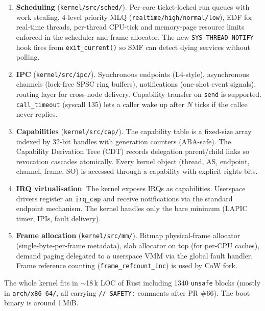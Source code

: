 \documentclass[11pt,a4paper]{article}
\begin{document}
\begin{enumerate}[leftmargin=1.6em,itemsep=0.2em]
  \item \textbf{Scheduling} (\texttt{kernel/src/sched/}). Per-core
        ticket-locked run queues with work stealing, 4-level priority
        MLQ (\texttt{realtime/high/normal/low}), EDF for real-time
        threads, per-thread CPU-tick and memory-page resource limits
        enforced in the scheduler and frame allocator. The new
        \texttt{SYS\_THREAD\_NOTIFY} hook fires from
        \texttt{exit\_current()} so SMF can detect dying services
        without polling.

  \item \textbf{IPC} (\texttt{kernel/src/ipc/}). Synchronous endpoints
        (L4-style), asynchronous channels (lock-free SPSC ring
        buffers), notifications (one-shot event signals), routing
        layer for cross-node delivery. Capability transfer on
        \texttt{send} is supported. \texttt{call\_timeout} (syscall
        135) lets a caller wake up after $N$ ticks if the callee
        never replies.

  \item \textbf{Capabilities} (\texttt{kernel/src/cap/}). The
        capability table is a fixed-size array indexed by 32-bit
        handles with generation counters (ABA-safe). The Capability
        Derivation Tree (CDT) records delegation parent/child links
        so revocation cascades atomically. Every kernel object
        (thread, AS, endpoint, channel, frame, SO) is accessed
        through a capability with explicit rights bits.

  \item \textbf{IRQ virtualisation}. The kernel exposes IRQs as
        capabilities. Userspace drivers register an \texttt{irq\_cap}
        and receive notifications via the standard endpoint
        mechanism. The kernel handles only the bare minimum (LAPIC
        timer, IPIs, fault delivery).

  \item \textbf{Frame allocation} (\texttt{kernel/src/mm/}). Bitmap
        physical-frame allocator (single-byte-per-frame metadata),
        slab allocator on top (for per-CPU caches), demand paging
        delegated to a userspace VMM via the global fault handler.
        Frame reference counting (\texttt{frame\_refcount\_inc}) is
        used by CoW fork.
\end{enumerate}

The whole kernel fits in $\sim$18\,k LOC of Rust including 1340
\texttt{unsafe} blocks (mostly in \texttt{arch/x86\_64/}, all carrying
\texttt{// SAFETY:} comments after PR \#66). The boot binary is around
1\,MiB.
\end{document}
